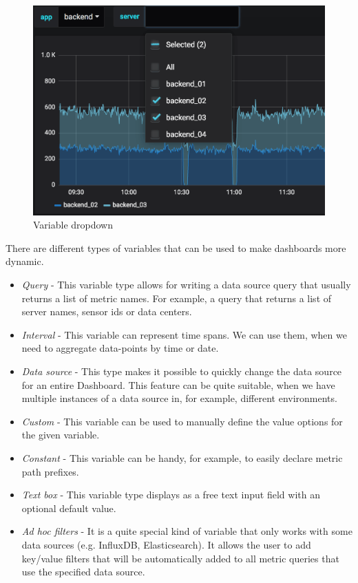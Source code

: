 \begin{figure}[H]
	\centering
	\includegraphics[width=130mm, keepaspectratio]{figures/variable-dropdown.png}
	\caption{Variable dropdown \cite{grafana-variables-dashboard-image}}
	\label{fig:variable-dropdown}
\end{figure}


There are different types of variables that can be used to make dashboards more dynamic. \cite{grafana-variables-types}
\begin{itemize}
	\item \emph{Query} - This variable type allows for writing a data source query that usually returns a list of metric names. For example, a query that returns a list of server names, sensor ids or data centers.
	\item \emph{Interval} - This variable can represent time spans. We can use them, when we need to aggregate data-points by time or date.
	\item \emph{Data source} - This type makes it possible to quickly change the data source for an entire Dashboard. This feature can be quite suitable, when we have multiple instances of a data source in, for example, different environments.
	\item \emph{Custom} - This variable can be used to manually define the value options for the given variable.
	\item \emph{Constant} - This variable can be handy, for example, to easily declare metric path prefixes. 
	\item \emph{Text box} - This variable type displays as a free text input field with an optional default value.
	\item \emph{Ad hoc filters} - It is a quite special kind of variable that only works with some data sources (e.g. InfluxDB, Elasticsearch). It allows the user to add key/value filters that will be automatically added to all metric queries that use the specified data source.
\end{itemize}


